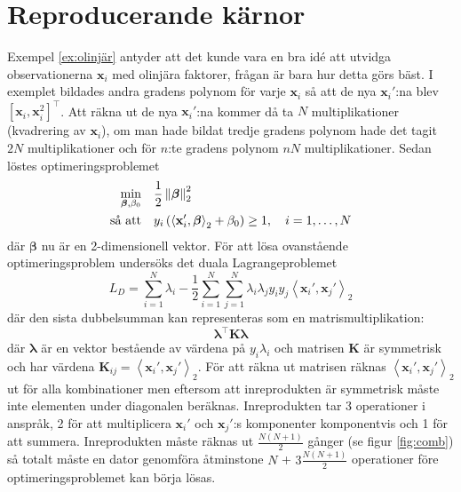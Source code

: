 \documentclass[a4paper, 12pt]{report}
\theoremstyle{definition}
\theoremstyle{remark}
\newcommand{\bfbeta}{{\boldsymbol{\beta}}}
\newcommand{\bfx}{\mathbf{x}}
\newcommand{\llangle}{\left\langle}
\newcommand{\rrangle}{\right\rangle}
\newcommand{\inner}[2]{\llangle #1, #2 \rrangle}
\begin{document}
\chapter{Reproducerande kärnor}
Exempel \ref{ex:olinjär} antyder att det kunde vara en bra idé att utvidga observationerna $\mathbf{x}_i$ med olinjära faktorer, frågan är bara hur detta görs bäst. I exemplet bildades andra gradens polynom för varje $\bfx_i$ så att de nya $\bfx_i'$:na blev $\left[\bfx_i, \bfx_i^2\right]^\intercal$. Att räkna ut de nya $\bfx_i'$:na kommer då ta $N$ multiplikationer (kvadrering av $\bfx_i$), om man hade bildat tredje gradens polynom hade det tagit $2N$ multiplikationer och för $n$:te gradens polynom $nN$ multiplikationer. Sedan löstes optimeringsproblemet 
\begin{equation*}
\begin{aligned}
\operatornamewithlimits{min}_{\bfbeta,\beta_0} & & &\frac{1}{2}\left\|\bfbeta
\right\|_2^2\\
\text{så att} & & &y_i\left(\inner{\bfx_i'}{\bfbeta}_2+\beta_0\right)\geq 1,\quad i=1,\dots,N
\end{aligned}
\end{equation*}
där $\bfbeta$ nu är en 2-dimensionell vektor. För att lösa ovanstående optimeringsproblem undersöks det duala Lagrangeproblemet
\begin{equation*}
		L_D= \sum_{i=1}^{N}\lambda_i - \frac{1}{2}\sum_{i=1}^{N}\sum_{j=1}^{N}\lambda_i\lambda_jy_iy_j\inner{\bfx_i'}{\bfx_j'}_2
\end{equation*}
där den sista dubbelsumman kan representeras som en matrismultiplikation:
\begin{equation*}
	\boldsymbol{\lambda}^\intercal\mathbf{K}\boldsymbol{\lambda}
\end{equation*}
där $\boldsymbol{\lambda}$ är en vektor bestående av värdena på $y_i\lambda_i$ och matrisen $\mathbf{K}$ är symmetrisk och har värdena $\mathbf{K}_{ij}=\inner{\bfx_i'}{\bfx_j'}_2$. För att räkna ut matrisen räknas $\inner{\bfx_i'}{\bfx_j'}_2$ ut för alla kombinationer men eftersom att inreprodukten är symmetrisk måste inte elementen under diagonalen beräknas. Inreprodukten tar 3 operationer i anspråk, 2 för att multiplicera $\bfx_i'$ och $\bfx_j'$:s komponenter komponentvis och 1 för att summera. Inreprodukten måste räknas ut $\frac{N(N+1)}{2}$ gånger (se figur \ref{fig:comb}) så totalt måste en dator genomföra åtminstone $N$ + $3\frac{N(N+1)}{2}$ operationer före optimeringsproblemet kan börja lösas.
\end{document}
